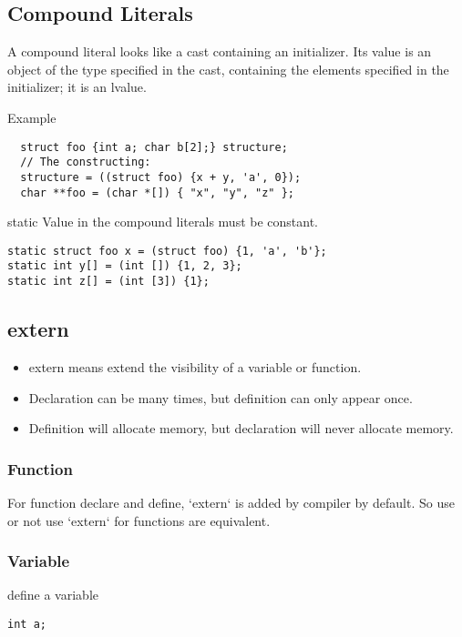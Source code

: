 \subsection{Compound Literals}

A compound literal looks like a cast containing an initializer.  Its
value is an object of the type specified in the cast, containing the
elements specified in the initializer; it is an lvalue.

Example

\begin{lstlisting}
  struct foo {int a; char b[2];} structure;
  // The constructing:
  structure = ((struct foo) {x + y, 'a', 0});
  char **foo = (char *[]) { "x", "y", "z" };
\end{lstlisting}

static Value in the compound literals must be constant.

\begin{lstlisting}
static struct foo x = (struct foo) {1, 'a', 'b'};
static int y[] = (int []) {1, 2, 3};
static int z[] = (int [3]) {1};
\end{lstlisting}

\subsection{extern}
\begin{itemize}
\item extern means extend the visibility of a variable or function.
\item Declaration can be many times, but definition can only appear once.
\item Definition will allocate memory, but declaration will never allocate memory.
\end{itemize}

\subsubsection{Function}

For function declare and define, `extern` is added by compiler by
default.  So use or not use `extern` for functions are equivalent.

\subsubsection{Variable}

define a variable

\begin{lstlisting}
int a;
\end{lstlisting}

